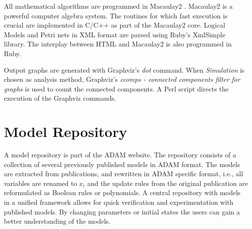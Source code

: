 \documentclass[10pt]{bmc_article}
\begin{document}
All mathematical algorithms are programmed in Macaulay2 \cite{M2}. Macaulay2 is a powerful computer algebra system. The routines for which fast execution is crucial are implemented in C/C++ as part of the Macaulay2 core. Logical Models and Petri nets in XML format are parsed using Ruby's XmlSimple library. The interplay between HTML and Macaulay2 is also programmed in Ruby.

Output graphs are generated with Graphviz's {\it dot} command. When {\it Simulation} is chosen as analysis method, Graphviz's {\it ccomps - connected components filter for graphs} is used to count the connected components. A Perl script directs the execution of the Graphviz commands.
\section{Model Repository}

A model repository is part of the ADAM website. The repository consists of a collection of several previously published models in ADAM format. The models are extracted from publications, and rewritten in ADAM specific format, i.e., all variables are renamed to $x_i$ and the update rules from the original publication are reformulated as Boolean rules or polynomials. A central repository with models in a unified framework allows for quick verification and experimentation with published models. By changing parameters or initial states the users can gain a better understanding of the models.
\end{document}
